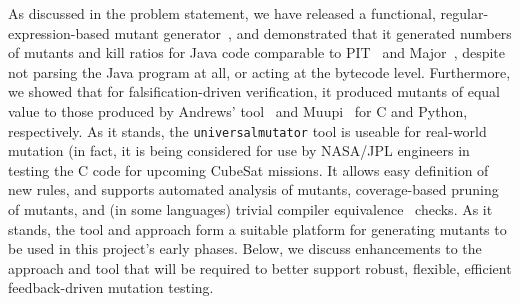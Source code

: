 As discussed in the problem statement, we have released a functional,
regular-expression-based mutant
generator~\cite{regexpMut,universalmutator}, and demonstrated that it
generated numbers of mutants and kill ratios for Java code comparable
to PIT~\cite{pittest} and Major~\cite{Major}, despite not parsing the
Java program at all, or acting at the bytecode level.  Furthermore, we
showed that for falsification-driven verification, it produced mutants
of equal value to those produced by Andrews' tool~\cite{mutant} and
Muupi~\cite{muupi} for C and Python, respectively.  As it stands, the
{\tt universalmutator} tool is useable for real-world mutation (in
fact, it is being considered for use by NASA/JPL engineers in testing
the C code for upcoming CubeSat missions.  It allows easy definition
of new rules, and supports automated analysis of mutants,
coverage-based pruning of mutants, and (in some languages) trivial
compiler equivalence~\cite{TCE} checks.  As it stands, the tool and
approach form a suitable platform for generating mutants to be used in
this project's early phases.  Below, we discuss enhancements to the
approach and tool that will be required to better support robust,
flexible, efficient feedback-driven mutation testing.
